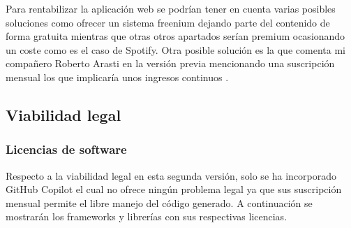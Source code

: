 Para rentabilizar la aplicación web se podrían tener en cuenta varias posibles soluciones como ofrecer un sistema freenium dejando parte del contenido de forma gratuita mientras que otras otros apartados serían premium ocasionando un coste como es el caso de Spotify. Otra posible solución es la que comenta mi compañero Roberto Arasti en la versión previa mencionando una suscripción mensual los que implicaría unos ingresos continuos \cite{previotfganexos}.

\subsection{Viabilidad legal}
\subsubsection{Licencias de software}
Respecto a la viabilidad legal en esta segunda versión, solo se ha incorporado GitHub Copilot el cual no ofrece ningún problema legal ya que sus suscripción mensual permite el libre manejo del código generado. A continuación se mostrarán los frameworks y librerías con sus respectivas licencias.

